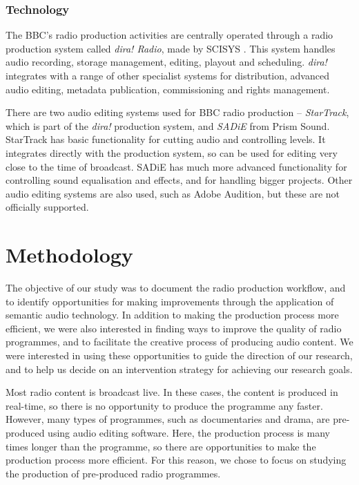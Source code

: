 \subsubsection{Technology}
The BBC's radio production activities are centrally operated through a radio production system
called \textit{dira!  Radio}, made by SCISYS \citep{SCISYS2015}. This system handles audio recording, storage
management, editing, playout and scheduling. \textit{dira!} integrates with a range of other specialist systems for
distribution, advanced audio editing, metadata publication, commissioning and rights management.

There are two audio editing systems used for BBC radio production -- \textit{StarTrack}, which is part of the
\textit{dira!} production system, and \textit{SADiE} from Prism Sound. StarTrack has basic functionality for cutting
audio and controlling levels. It integrates directly with the production system, so can be used for editing very close
to the time of broadcast.  SADiE has much more advanced functionality for controlling sound equalisation and effects,
and for handling bigger projects.  Other audio editing systems are also used, such as Adobe Audition, but these are not
officially supported.

\section{Methodology}\label{sec:ethno-method}


The objective of our study was to document the radio production workflow, and to identify opportunities for making
improvements through the application of semantic audio technology.  In addition to making the production process more
efficient, we were also interested in finding ways to improve the quality of radio programmes, and to facilitate the
creative process of producing audio content.  We were interested in using these opportunities to guide the direction of
our research, and to help us decide on an intervention strategy for achieving our research goals. 

Most radio content is broadcast live. In these cases, the content is produced in real-time, so there is no opportunity
to produce the programme any faster. However, many types of programmes, such as documentaries and drama, are
pre-produced using audio editing software. Here, the production process is many times longer than the programme, so
there are opportunities to make the production process more efficient.  For this reason, we chose to focus on studying
the production of pre-produced radio programmes.

